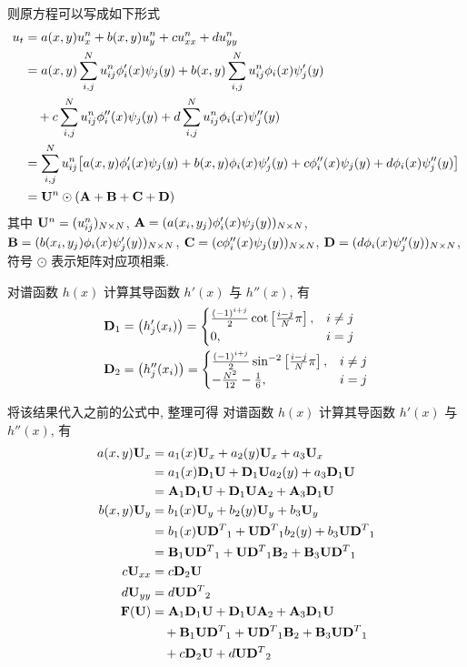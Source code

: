 则原方程可以写成如下形式
\[ \begin{aligned}
u_t &= a(x, y) u_x^n + b(x, y) u_y^n + c u_{xx}^n + d u_{yy}^n \\
    &= a(x, y) \sum_{i, j}^N u_{ij}^n \phi_i'(x) \psi_j(y)
        + b(x, y)\sum_{i, j}^N u_{ij}^n \phi_i(x) \psi_j'(y) \\
        &\quad+c\sum_{i, j}^N u_{ij}^n \phi_i''(x) \psi_j(y)
        + d \sum_{i, j}^N u_{ij}^n \phi_i(x) \psi_j''(y) \\
    &= \sum_{i, j}^N u_{ij}^n \bigl[ a(x, y) \phi_i'(x) \psi_j(y)
        + b(x, y) \phi_i(x) \psi_j'(y)
        + c \phi_i''(x) \psi_j(y) + d \phi_i(x) \psi_j''(y) \bigr] \\
    &= {\mathbf U}^n \odot ({\mathbf A} + {\mathbf B} + {\mathbf C} + {\mathbf D})
\end{aligned} \]
其中 ${\mathbf U}^n = (u_{ij}^n)_{N \times N}$,
$\mma = (a(x_i, y_j) \* \phi_i'(x) \* \psi_j(y))_{N \times N}$,
$\mmb = (b(x_i, y_j) \* \phi_i(x) \* \psi_j'(y))_{N \times N}$,
$\mmc = (c \* \phi_i''(x) \* \psi_j(y))_{N \times N}$,
$\mmd = (d \* \phi_i(x) \* \psi_j''(y))_{N \times N}$,
符号 $\odot$ 表示矩阵对应项相乘.

对谱函数 $h(x)$ 计算其导函数 $h'(x)$ 与 $h''(x)$, 有
\[ \begin{aligned}
{\mathbf D}_1 &= \bigl( h_j'(x_i) \bigr) = \begin{cases}
    \frac{(-1)^{i+j}}{2}\cot\left[\frac{i-j}{N}\pi\right], &i \ne j \\
    0, &i = j \end{cases} \\
{\mathbf D}_2 &= \bigl( h_j''(x_i) \bigr) = \begin{cases}
    \frac{(-1)^{i+j}}{2}\sin^{-2}\left[\frac{i-j}{N}\pi\right], &i \ne j \\
    -\frac{N^2}{12} - \frac{1}{6}, &i = j \end{cases}
\end{aligned} \]

将该结果代入之前的公式中, 整理可得
对谱函数 $h(x)$ 计算其导函数 $h'(x)$ 与 $h''(x)$, 有
\[ \begin{aligned}
a(x, y){\mathbf U}_x &= a_1(x){\mathbf U}_x + a_2(y){\mathbf U}_x + a_3{\mathbf U}_x \\
    &= a_1(x){\mathbf D}_1{\mathbf U} + {\mathbf D}_1{\mathbf U} a_2(y) + a_3{\mathbf D}_1{\mathbf U} \\
    &= {\mathbf A}_1{\mathbf D}_1{\mathbf U} + {\mathbf D}_1{\mathbf U}{\mathbf A}_2 + {\mathbf A}_3{\mathbf D}_1{\mathbf U} \\
b(x, y){\mathbf U}_y &= b_1(x){\mathbf U}_y + b_2(y){\mathbf U}_y + b_3{\mathbf U}_y \\
    &= b_1(x){\mathbf U}{{\mathbf D}^T}_1 + {\mathbf U}{{\mathbf D}^T}_1 b_2(y) + b_3{\mathbf U}{{\mathbf D}^T}_1\\
    &= {\mathbf B}_1{\mathbf U}{{\mathbf D}^T}_1 + {\mathbf U}{{\mathbf D}^T}_1{\mathbf B}_2 + {\mathbf B}_3{\mathbf U}{{\mathbf D}^T}_1 \\
c{\mathbf U}_{xx} &= c{\mathbf D}_2{\mathbf U} \\
d{\mathbf U}_{yy} &= d{\mathbf U}{{\mathbf D}^T}_2 \\
{\mathbf F}({\mathbf U}) &= {\mathbf A}_1{\mathbf D}_1{\mathbf U} + {\mathbf D}_1{\mathbf U}{\mathbf A}_2 + {\mathbf A}_3{\mathbf D}_1{\mathbf U} \\
    &\quad+ {\mathbf B}_1{\mathbf U}{{\mathbf D}^T}_1 + {\mathbf U}{{\mathbf D}^T}_1{\mathbf B}_2 + {\mathbf B}_3{\mathbf U}{{\mathbf D}^T}_1 \\
    &\quad+ c{\mathbf D}_2{\mathbf U} + d{\mathbf U}{{\mathbf D}^T}_2
\end{aligned} \]

